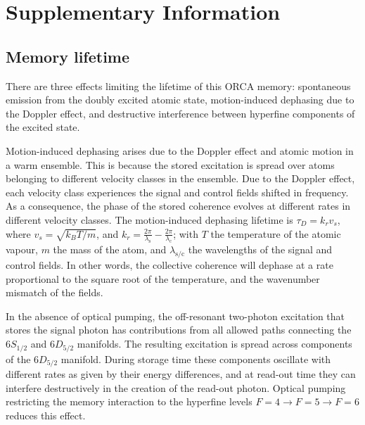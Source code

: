 \section*{Supplementary Information}
\setcounter{figure}{0}
\renewcommand{\thefigure}{S.\arabic{figure}}
\setcounter{table}{0}
\renewcommand{\thetable}{S.\arabic{table}}
\setcounter{subsection}{0}
\renewcommand{\thesubsection}{S.\arabic{subsection}}
\setcounter{equation}{0}
\renewcommand{\theequation}{S.\arabic{equation}}

\subsection{Memory lifetime \label{lifetime}}
There are three effects limiting the lifetime of this ORCA memory: spontaneous emission from the doubly excited atomic state, motion-induced dephasing due to the Doppler effect, and destructive interference between hyperfine components of the excited state.

Motion-induced dephasing arises due to the Doppler effect and atomic motion in a warm ensemble. This is because the stored excitation is spread over atoms belonging to different velocity classes in the ensemble. Due to the Doppler effect, each velocity class experiences the signal and control fields shifted in frequency. As a consequence, the phase of the stored coherence evolves at different rates in different velocity classes. The motion-induced dephasing lifetime is \cite{Zhao2009} $\tau_D = k_r v_s$, where $v_s = \sqrt{k_B T/m}$, and $k_r=\frac{2\pi}{\lambda_\mathrm{s}} -\frac{2\pi}{\lambda_\mathrm{c}}$; with $T$ the temperature of the atomic vapour, $m$ the mass of the atom, and $\lambda_\mathrm{s/c}$ the wavelengths of the signal and control fields. In other words, the collective coherence will dephase at a rate proportional to the square root of the temperature, and the wavenumber mismatch of the fields.

In the absence of optical pumping, the off-resonant two-photon excitation that stores the signal photon has contributions from all allowed paths connecting the $6S_{1/2}$ and $6D_{5/2}$ manifolds. The resulting excitation is spread across components of the $6D_{5/2}$ manifold. During storage time these components oscillate with different rates as given by their energy differences, and at read-out time they can interfere destructively in the creation of the read-out photon. Optical pumping restricting the memory interaction to the hyperfine levels $F=4 \rightarrow F=5 \rightarrow F=6$ reduces this effect.

